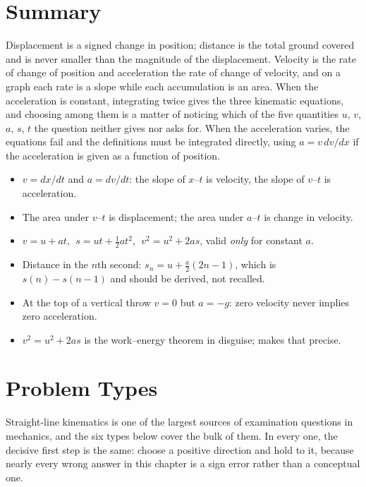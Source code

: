 \section{Summary}\label{sec:summary2}
Displacement is a signed change in position; distance is the total ground covered and is never smaller
than the magnitude of the displacement. Velocity is the rate of change of position and acceleration the
rate of change of velocity, and on a graph each rate is a slope while each accumulation is an area.
When the acceleration is constant, integrating twice gives the three kinematic equations, and choosing
among them is a matter of noticing which of the five quantities $u$, $v$, $a$, $s$, $t$ the question
neither gives nor asks for. When the acceleration varies, the equations fail and the definitions must
be integrated directly, using $a=v\,dv/dx$ if the acceleration is given as a function of position.

\begin{itemize}
\item $v=dx/dt$ and $a=dv/dt$: the slope of $x$--$t$ is velocity, the slope of $v$--$t$ is acceleration.
\item The area under $v$--$t$ is displacement; the area under $a$--$t$ is change in velocity.
\item $v=u+at$, $\;s=ut+\tfrac12at^2$, $\;v^2=u^2+2as$, valid \emph{only} for constant $a$.
\item Distance in the $n$th second: $s_n=u+\tfrac{a}{2}(2n-1)$, which is $s(n)-s(n-1)$ and should be
      derived, not recalled.
\item At the top of a vertical throw $v=0$ but $a=-g$: zero velocity never implies zero acceleration.
\item $v^2=u^2+2as$ is the work--energy theorem in disguise;  makes that precise.
\end{itemize}

\section{Problem Types}\label{sec:types2}
Straight-line kinematics is one of the largest sources of examination questions in mechanics, and the
six types below cover the bulk of them. In every one, the decisive first step is the same: choose a positive direction and
hold to it, because nearly every wrong answer in this chapter is a sign error rather than a conceptual one.

